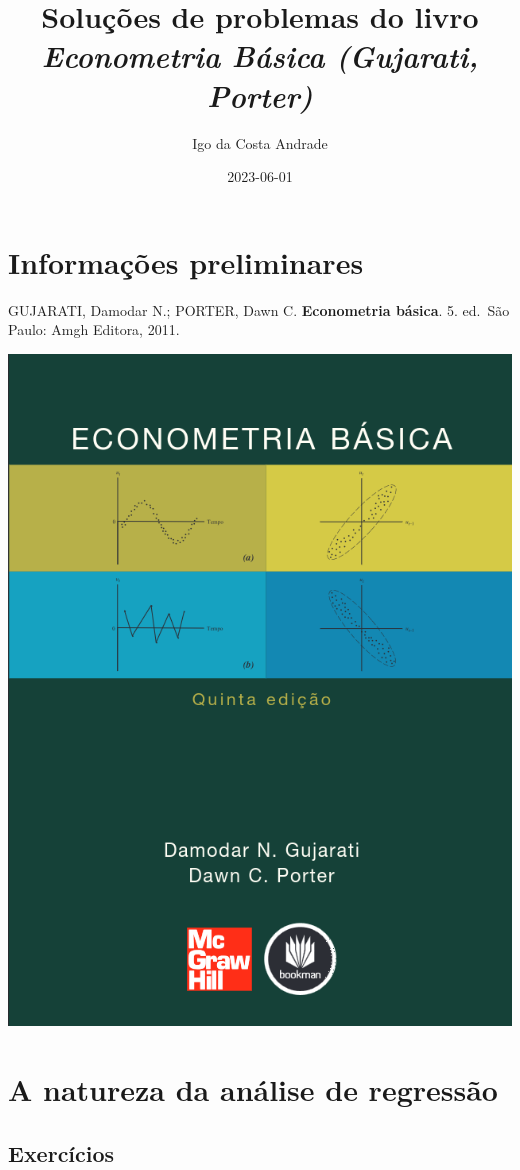 \documentclass[
]{article}
\title{Soluções de problemas do livro \emph{Econometria Básica (Gujarati, Porter)}}
\author{Igo da Costa Andrade}
\date{2023-06-01}
\begin{document}
\maketitle

{
\setcounter{tocdepth}{2}
\tableofcontents
}
\newpage

\hypertarget{informauxe7uxf5es-preliminares}{%
\section*{Informações preliminares}\label{informauxe7uxf5es-preliminares}}

GUJARATI, Damodar N.; PORTER, Dawn C. \textbf{Econometria básica}. 5. ed.~São Paulo: Amgh Editora, 2011.

\begin{center}\includegraphics[width=0.5\linewidth]{assets/images/econometria_gujarati_capa} \end{center}

\newpage

\hypertarget{a-natureza-da-anuxe1lise-de-regressuxe3o}{%
\section{A natureza da análise de regressão}\label{a-natureza-da-anuxe1lise-de-regressuxe3o}}

\hypertarget{exercuxedcios}{%
\subsection*{Exercícios}\label{exercuxedcios}}
\end{document}

